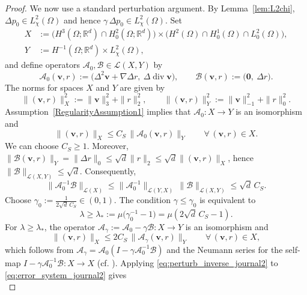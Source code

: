 \documentclass[10pt]{amsart}
\numberwithin{equation}{section}
\begin{document}
\begin{proof}
We now use a standard perturbation argument. By Lemma~\ref{lem:L2chi}, $\Delta p_0\in L^2_\chi(\Omega)$ and hence $\gamma\,\Delta p_0\in L^2_\chi(\Omega)$.
Set
\begin{align*}
X&:=\big(H^3(\Omega;\mathbb R^d)\cap H_0^2(\Omega;\mathbb R^d)\big)\times
\big(H^2(\Omega)\cap H_0^1(\Omega)\cap L_0^2(\Omega)\big), \\
Y&:=H^{-1}(\Omega;\mathbb R^d)\times L^2_\chi(\Omega),
\end{align*}
and
define operators $\mathcal A_0,\mathcal B\in\mathcal L(X,Y)$ by
\[
\mathcal A_0(\boldsymbol v,r):=\big(\Delta^2\boldsymbol v+\nabla\Delta r,\ \Delta\operatorname{div}\boldsymbol v\big),
\qquad
\mathcal B(\boldsymbol v,r):=\big(\boldsymbol 0,\ \Delta r\big).
\]
The norms for spaces $X$ and $Y$ are given by $$
\|(\boldsymbol v,r)\|_X^2:=\|\boldsymbol v\|_3^2+\|r\|_2^2,
\qquad
\|(\boldsymbol v,r)\|_Y^2:=\|\boldsymbol v\|_{-1}^2+\|r\|_0^2.
$$	
Assumption~\ref{RegularityAssumption1} implies that $\mathcal A_0:X\to Y$ is an isomorphism and
\begin{equation}\label{eq:A0inv_bound_journal2}
\|(\boldsymbol v,r)\|_{X}\le C_S\,\|\mathcal A_0(\boldsymbol v,r)\|_{Y}
\qquad\forall\,(\boldsymbol v,r)\in X.
\end{equation}
We can choose $C_S\geq1$.
Moreover, $\|\mathcal B(\boldsymbol v,r)\|_Y=\|\Delta r\|_0\le \sqrt{d}\|r\|_2\le \sqrt{d}\|(\boldsymbol v,r)\|_X$,
hence $\|\mathcal B\|_{\mathcal L(X,Y)}\le \sqrt{d}$.
Consequently,
\[
\|\mathcal A_0^{-1}\mathcal B\|_{\mathcal L(X)}\le
\|\mathcal A_0^{-1}\|_{\mathcal L(Y,X)}\,\|\mathcal B\|_{\mathcal L(X,Y)}
\le \sqrt{d}\,C_S.
\]
Choose
$
\gamma_0:=\frac{1}{2\sqrt{d}\,C_S}\in(0,1).
$
The condition $\gamma\le\gamma_0$ is equivalent to
$$
\lambda\ge \lambda_\ast:=\mu\Big(\gamma_0^{-1}-1\Big)=\mu(2\sqrt{d}\,C_S-1).$$
For $\lambda\ge\lambda_\ast$,
the operator
$\mathcal A_\gamma:=\mathcal A_0-\gamma\mathcal B:X\to Y$ is an isomorphism and
\begin{equation}\label{eq:perturb_inverse_journal2}
\|(\boldsymbol v,r)\|_X\le 2C_S\,\|\mathcal A_\gamma(\boldsymbol v,r)\|_Y
\qquad\forall\,(\boldsymbol v,r)\in X,
\end{equation}
which follows from $\mathcal A_\gamma=\mathcal A_0(I-\gamma\mathcal A_0^{-1}\mathcal B)$ and the Neumann series for the self-map
$I-\gamma\mathcal A_0^{-1}\mathcal B:X\to X$ (cf. \cite[Chapter~I, \S4, Example~4.5, (4.22) and the perturbation estimate (4.24), pp.~30--31]{Kato1995}).
Applying \eqref{eq:perturb_inverse_journal2} to \eqref{eq:error_system_journal2} gives
\begin{equation}\label{eq:error_est_journal2}

\end{equation}
\end{proof}
\end{document}

